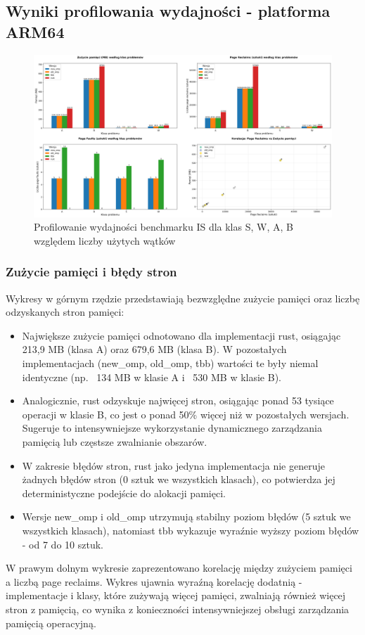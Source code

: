 \subsection{Wyniki profilowania wydajności - platforma ARM64}
\begin{figure}[H]
    \centering
    \includegraphics[width=\textwidth]{analiza/images/parallel/is/chart_01_memory_comparison.png}
    \caption{Profilowanie wydajności benchmarku IS dla klas S, W, A, B względem liczby użytych wątków}
    \label{is_porownanie_zuzycia_pamieci}
\end{figure}
\subsubsection{Zużycie pamięci i błędy stron}
Wykresy w górnym rzędzie przedstawiają bezwzględne zużycie pamięci oraz liczbę odzyskanych stron pamięci:
\begin{itemize}
    \item Największe zużycie pamięci odnotowano dla implementacji rust, osiągając 213,9 MB (klasa A) oraz 679,6 MB (klasa B). W pozostałych implementacjach (new\_omp, old\_omp, tbb) wartości te były niemal identyczne (np. ~134 MB w klasie A i ~530 MB w klasie B).
    \item Analogicznie, rust odzyskuje najwięcej stron, osiągając ponad 53 tysiące operacji w klasie B, co jest o ponad 50\% więcej niż w pozostałych wersjach. Sugeruje to intensywniejsze wykorzystanie dynamicznego zarządzania pamięcią lub częstsze zwalnianie obszarów.
    \item W zakresie błędów stron, rust jako jedyna implementacja nie generuje żadnych błędów stron (0 sztuk we wszystkich klasach), co potwierdza jej deterministyczne podejście do alokacji pamięci.
    \item Wersje new\_omp i old\_omp utrzymują stabilny poziom błędów (5 sztuk we wszystkich klasach), natomiast tbb wykazuje wyraźnie wyższy poziom błędów - od 7 do 10 sztuk.
\end{itemize}
W prawym dolnym wykresie zaprezentowano korelację między zużyciem pamięci a liczbą page reclaims. Wykres ujawnia wyraźną korelację dodatnią - implementacje i klasy, które zużywają więcej pamięci, zwalniają również więcej stron z pamięcią, co wynika z konieczności intensywniejszej obsługi zarządzania pamięcią operacyjną.

